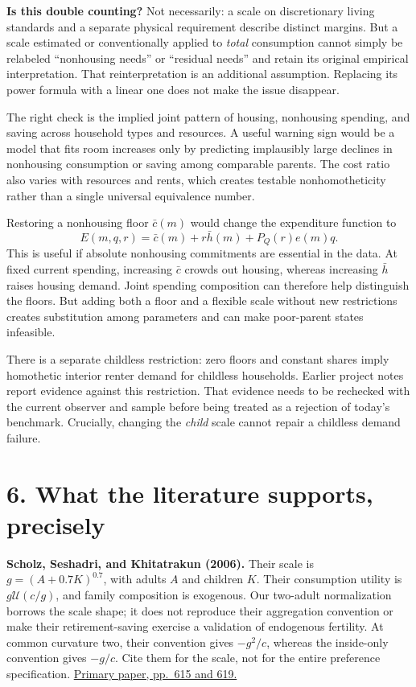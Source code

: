\documentclass[11pt,letterpaper]{article}
\newcommand{\U}{\mathcal U}
\newcommand{\hh}{\bar h}
\newcommand{\cc}{\bar c}
\newcommand{\page}[1]{\newpage\section*{#1}}
\begin{document}
\textbf{Is this double counting?} Not necessarily: a scale on discretionary living standards and a separate physical requirement describe distinct margins. But a scale estimated or conventionally applied to \emph{total} consumption cannot simply be relabeled ``nonhousing needs'' or ``residual needs'' and retain its original empirical interpretation. That reinterpretation is an additional assumption. Replacing its power formula with a linear one does not make the issue disappear.

The right check is the implied joint pattern of housing, nonhousing spending, and saving across household types and resources. A useful warning sign would be a model that fits room increases only by predicting implausibly large declines in nonhousing consumption or saving among comparable parents. The cost ratio also varies with resources and rents, which creates testable nonhomotheticity rather than a single universal equivalence number.

Restoring a nonhousing floor $\cc(m)$ would change the expenditure function to
\[
E(m,q,r)=\cc(m)+r\hh(m)+P_Q(r)e(m)q.
\]
This is useful if absolute nonhousing commitments are essential in the data. At fixed current spending, increasing $\cc$ crowds out housing, whereas increasing $\hh$ raises housing demand. Joint spending composition can therefore help distinguish the floors. But adding both a floor and a flexible scale without new restrictions creates substitution among parameters and can make poor-parent states infeasible.

There is a separate childless restriction: zero floors and constant shares imply homothetic interior renter demand for childless households. Earlier project notes report evidence against this restriction. That evidence needs to be rechecked with the current observer and sample before being treated as a rejection of today's benchmark. Crucially, changing the \emph{child} scale cannot repair a childless demand failure.

\page{6. What the literature supports, precisely}
\textbf{Scholz, Seshadri, and Khitatrakun (2006).} Their scale is $g=(A+0.7K)^{0.7}$, with adults $A$ and children $K$. Their consumption utility is $g\U(c/g)$, and family composition is exogenous. Our two-adult normalization borrows the scale shape; it does not reproduce their aggregation convention or make their retirement-saving exercise a validation of endogenous fertility. At common curvature two, their convention gives $-g^2/c$, whereas the inside-only convention gives $-g/c$. Cite them for the scale, not for the entire preference specification. \href{https://users.ssc.wisc.edu/~aseshadr/Publications/optimality.pdf}{Primary paper, pp.\ 615 and 619.}
\end{document}
